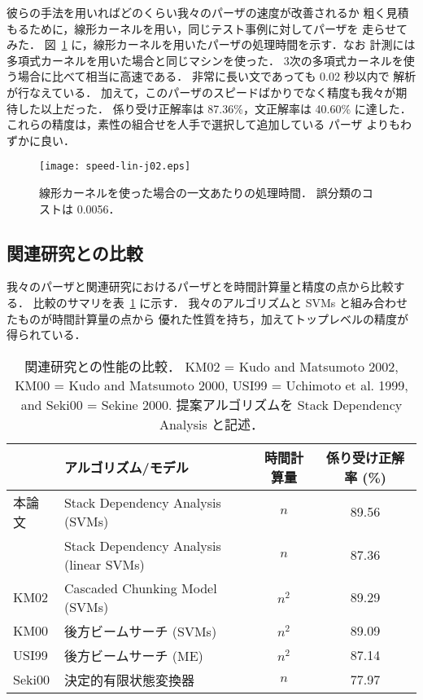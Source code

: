 \documentclass[japanese]{jnlp_1.2c}
\begin{document}
彼らの手法を用いればどのくらい我々のパーザの速度が改善されるか
粗く見積もるために，線形カーネルを用い，同じテスト事例に対してパーザを
走らせてみた．
図~\ref{speed:lin} に，線形カーネルを用いたパーザの処理時間を示す．なお
計測には多項式カーネルを用いた場合と同じマシンを使った．
3次の多項式カーネルを使う場合に比べて相当に高速である．
非常に長い文であっても 0.02 秒以内で
解析が行なえている．
加えて，このパーザのスピードばかりでなく精度も我々が期待した以上だった．
係り受け正解率は 87.36\%，文正解率は 40.60\% に達した．
これらの精度は，素性の組合せを人手で選択して追加している
パーザ \cite{Uchimoto1999} よりもわずかに良い．

\begin{figure}[t]
\begin{center}
    \texttt{[image: speed-lin-j02.eps]}
\end{center}
\caption{線形カーネルを使った場合の一文あたりの処理時間．
誤分類のコストは 0.0056．}\label{speed:lin}
\end{figure}


\subsection{関連研究との比較}\label{sec:relatedwork}

我々のパーザと関連研究におけるパーザとを時間計算量と精度の点から比較する．
比較のサマリを表~\ref{tbl:comp} に示す．
我々のアルゴリズムと SVMs と組み合わせたものが時間計算量の点から
優れた性質を持ち，加えてトップレベルの精度が得られている．

    \begin{table}[t]
\caption{関連研究との性能の比較． KM02 = Kudo and Matsumoto 2002, KM00 = Kudo and Matsumoto 
\hspace*{27pt}2000, USI99 = Uchimoto et al. 1999, and Seki00 = Sekine 2000. 提案アルゴリズムを Stack
\hspace*{27pt}Dependency Analysis と記述．}
\label{tbl:comp}
\begin{center}
\begin{tabular}{l|l|c|c} \hline\hline
 & アルゴリズム/モデル & \multicolumn{1}{c|}{時間計算量}
   & 係り受け正解率 (\%) \\
\hline
本論文 & Stack Dependency Analysis (SVMs) & $n$ & 89.56 \\
           & Stack Dependency Analysis (linear SVMs) & $n$ & 87.36 \\ \hline
KM02 & Cascaded Chunking Model (SVMs) & $n^2$ & 89.29 \\
KM00 & 後方ビームサーチ (SVMs) & $n^2$ & 89.09 \\
USI99 & 後方ビームサーチ (ME) & $n^2$ & 87.14 \\
Seki00 & 決定的有限状態変換器 & $n$ & 77.97 \\ \hline
\end{tabular}
\end{center}
    \end{table}
\end{document}
